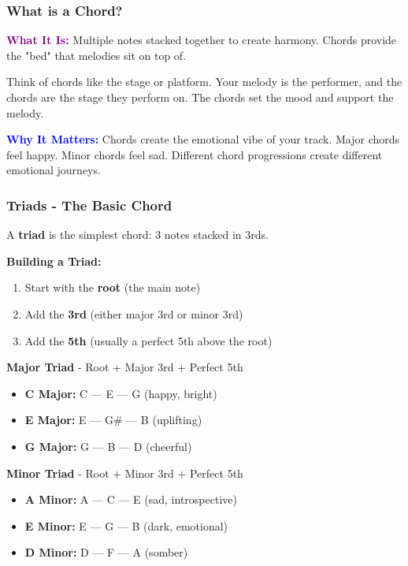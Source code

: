 \documentclass[11pt,letterpaper]{article}
\newcommand{\purple}[1]{\textcolor{purple}{\textbf{#1}}}
\newcommand{\bluepurple}[1]{\textcolor{blue}{\textbf{#1}}}
\begin{document}
\subsubsection{What is a Chord?}

\textbf{\purple{What It Is:}} Multiple notes stacked together to create harmony. Chords provide the "bed" that melodies sit on top of.

Think of chords like the stage or platform. Your melody is the performer, and the chords are the stage they perform on. The chords set the mood and support the melody.

\textbf{\bluepurple{Why It Matters:}} Chords create the emotional vibe of your track. Major chords feel happy. Minor chords feel sad. Different chord progressions create different emotional journeys.

\subsubsection{Triads - The Basic Chord}

A \textbf{triad} is the simplest chord: 3 notes stacked in 3rds.

\textbf{Building a Triad:}
\begin{enumerate}[leftmargin=*]
\item Start with the \textbf{root} (the main note)
\item Add the \textbf{3rd} (either major 3rd or minor 3rd)
\item Add the \textbf{5th} (usually a perfect 5th above the root)
\end{enumerate}

\textbf{Major Triad} - Root + Major 3rd + Perfect 5th
\begin{itemize}[leftmargin=*]
\item \textbf{C Major:} C — E — G (happy, bright)
\item \textbf{E Major:} E — G\# — B (uplifting)
\item \textbf{G Major:} G — B — D (cheerful)
\end{itemize}

\textbf{Minor Triad} - Root + Minor 3rd + Perfect 5th
\begin{itemize}[leftmargin=*]
\item \textbf{A Minor:} A — C — E (sad, introspective)
\item \textbf{E Minor:} E — G — B (dark, emotional)
\item \textbf{D Minor:} D — F — A (somber)
\end{itemize}
\end{document}
